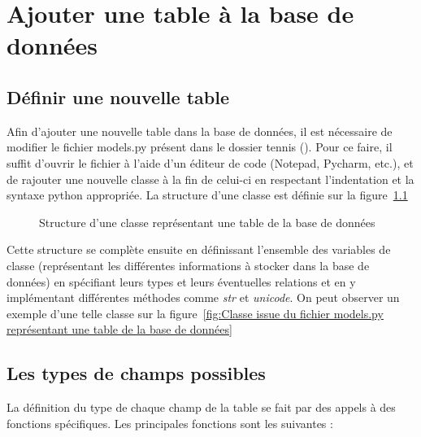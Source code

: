 \chapter{Ajouter une table à la base de données}

\section{Définir une nouvelle table}

Afin d'ajouter une nouvelle table dans la base de données, il est nécessaire de modifier le fichier models.py présent dans le dossier tennis (). Pour ce faire, il suffit d'ouvrir le fichier à l'aide d'un éditeur de code (Notepad, Pycharm, etc.), et de rajouter une nouvelle classe à la fin de celui-ci en respectant l'indentation et la syntaxe python appropriée. La structure d'une classe est définie sur la figure~\ref{fig:Structure d'une classe représentant une table de la base de données}

\begin{figure}[!ht]
\centering
\begin{framed}

\end{framed}
\caption{Structure d'une classe représentant une table de la base de données}
\label{fig:Structure d'une classe représentant une table de la base de données}
\end{figure}
\FloatBarrier

Cette structure se complète ensuite en définissant l'ensemble des variables de classe (représentant les différentes informations à stocker dans la base de données) en spécifiant leurs types et leurs éventuelles relations et en y implémentant différentes méthodes comme \textit{str} et \textit{unicode}. On peut observer un exemple d'une telle classe sur la figure~\ref{fig:Classe issue du fichier models.py représentant une table de la base de données}

\section{Les types de champs possibles}

La définition du type de chaque champ de la table se fait par des appels à des fonctions spécifiques. Les principales fonctions sont les suivantes :\\

